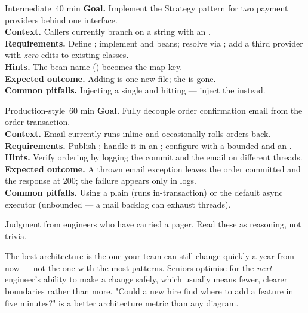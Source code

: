 \begin{minilab}{Intermediate}{~40 min}
\textbf{Goal.} Implement the Strategy pattern for two payment providers behind one interface.\\
\textbf{Context.} Callers currently branch on a  string with an .\\
\textbf{Requirements.} Define ; implement  and  beans; resolve via ; add a third provider with \emph{zero} edits to existing classes.\\
\textbf{Hints.} The bean name () becomes the map key.\\
\textbf{Expected outcome.} Adding  is one new file; the  is gone.\\
\textbf{Common pitfalls.} Injecting a single  and hitting  --- inject the  instead.
\end{minilab}

\begin{minilab}{Production-style}{~60 min}
\textbf{Goal.} Fully decouple order confirmation email from the order transaction.\\
\textbf{Context.} Email currently runs inline and occasionally rolls orders back.\\
\textbf{Requirements.} Publish ; handle it in an ; configure  with a bounded  and an .\\
\textbf{Hints.} Verify ordering by logging the commit and the email on different threads.\\
\textbf{Expected outcome.} A thrown email exception leaves the order committed and the response at 200; the failure appears only in logs.\\
\textbf{Common pitfalls.} Using a plain  (runs in-transaction) or the default async executor (unbounded --- a mail backlog can exhaust threads).
\end{minilab}


Judgment from engineers who have carried a pager. Read these as reasoning, not trivia.

\begin{seniornote}
The best architecture is the one your team can still change quickly a year from now --- not the one with the most patterns. Seniors optimise for the \emph{next} engineer's ability to make a change safely, which usually means fewer, clearer boundaries rather than more. "Could a new hire find where to add a feature in five minutes?" is a better architecture metric than any diagram.
\end{seniornote}

